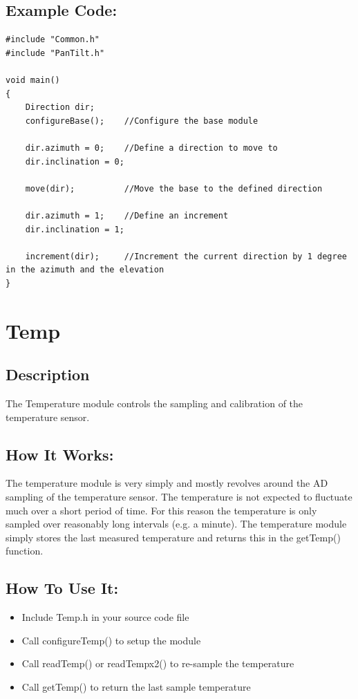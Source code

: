 \documentclass[]{report}
\begin{document}
\section{Example Code:}
\begin{lstlisting}
#include "Common.h"
#include "PanTilt.h"

void main()
{
	Direction dir;
	configureBase();	//Configure the base module

	dir.azimuth = 0;	//Define a direction to move to
	dir.inclination = 0;
	
	move(dir);			//Move the base to the defined direction
	
	dir.azimuth = 1;	//Define an increment
	dir.inclination = 1;
	
	increment(dir);		//Increment the current direction by 1 degree in the azimuth and the elevation
}
\end{lstlisting}

\chapter{Temp}
\section{Description}
The Temperature module controls the sampling and calibration of the temperature sensor.

\section{How It Works:}
The temperature module is very simply and mostly revolves around the AD sampling of the temperature sensor. The temperature is not expected to fluctuate much over a short period of time. For this reason the temperature is only sampled over reasonably long intervals (e.g. a minute). The temperature module simply stores the last measured temperature and returns this in the getTemp() function.

\section{How To Use It:}
\begin{itemize}
	\item Include Temp.h in your source code file
	\item Call configureTemp() to setup the module
	\item Call readTemp() or readTempx2() to re-sample the temperature
	\item Call getTemp() to return the last sample temperature
\end{itemize}
\end{document}
